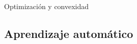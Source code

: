\documentclass{beamer}
\begin{document}
\begin{frame}{Optimización y convexidad}



\end{frame}




\subsection{Aprendizaje automático}
\end{document}
